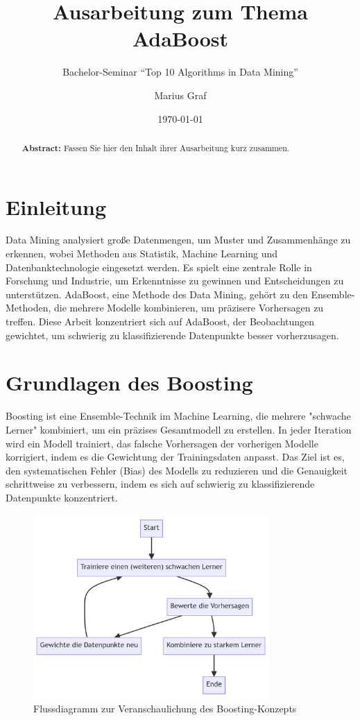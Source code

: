 \documentclass[11pt,a4paper,oneside]{scrartcl}
\begin{document}
\title{Ausarbeitung zum Thema AdaBoost}
\subtitle{Bachelor-Seminar "`Top 10 Algorithms in Data Mining"'}

\author{Marius Graf}
\date{\today}

\maketitle

\tableofcontents

\begin{abstract}
    \noindent\textbf{Abstract:}
    Fassen Sie hier den Inhalt ihrer Ausarbeitung kurz zusammen.
\end{abstract}

\section{Einleitung}
Data Mining analysiert große Datenmengen, um Muster und Zusammenhänge zu erkennen,
wobei Methoden aus Statistik, Machine Learning und Datenbanktechnologie eingesetzt werden.
Es spielt eine zentrale Rolle in Forschung und Industrie, um Erkenntnisse zu gewinnen und
Entscheidungen zu unterstützen. AdaBoost, eine Methode des Data Mining, gehört zu den
Ensemble-Methoden, die mehrere Modelle kombinieren, um präzisere Vorhersagen zu treffen.
Diese Arbeit konzentriert sich auf AdaBoost, der Beobachtungen gewichtet, um schwierig zu
klassifizierende Datenpunkte besser vorherzusagen.

\section{Grundlagen des Boosting}
Boosting ist eine Ensemble-Technik im Machine Learning, die mehrere "schwache Lerner" kombiniert,
um ein präzises Gesamtmodell zu erstellen. In jeder Iteration wird ein Modell trainiert, das falsche
Vorhersagen der vorherigen Modelle korrigiert, indem es die Gewichtung der Trainingsdaten anpasst.
Das Ziel ist es, den systematischen Fehler (Bias) des Modells zu reduzieren und die Genauigkeit
schrittweise zu verbessern, indem es sich auf schwierig zu klassifizierende Datenpunkte konzentriert.

\begin{figure}[h]
    \centering
    \includegraphics[width=0.8\textwidth]{"./figures/Boosting_Graph"}
    \caption{Flussdiagramm zur Veranschaulichung des Boosting-Konzepts}
\end{figure}
\end{document}
